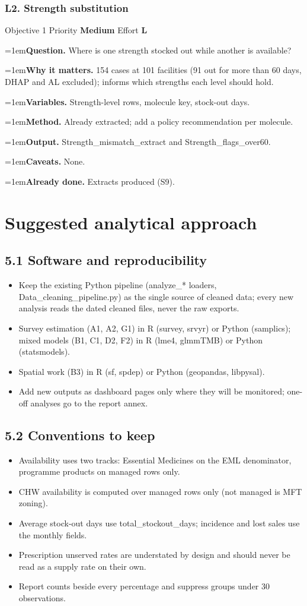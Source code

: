 \documentclass[10pt,a4paper]{article}
\newcommand{\field}[2]{\par\hangindent=1em\textbf{#1.} #2}
\begin{document}
\subsubsection*{L2. Strength substitution}
{\footnotesize\color{gray} Objective 1 \textperiodcentered{} Priority \textbf{Medium} \textperiodcentered{} Effort \textbf{L}}
\field{Question}{Where is one strength stocked out while another is available?}
\field{Why it matters}{154 cases at 101 facilities (91 out for more than 60 days, DHAP and AL excluded); informs which strengths each level should hold.}
\field{Variables}{Strength-level rows, molecule key, stock-out days.}
\field{Method}{Already extracted; add a policy recommendation per molecule.}
\field{Output}{Strength\_mismatch\_extract and Strength\_flags\_over60.}
\field{Caveats}{None.}
\field{Already done}{Extracts produced (S9).}
\section{Suggested analytical approach}
\subsection{5.1 Software and reproducibility}
\begin{itemize}\item Keep the existing Python pipeline (analyze\_* loaders, Data\_cleaning\_pipeline.py) as the single source of cleaned data; every new analysis reads the dated cleaned files, never the raw exports.
\item Survey estimation (A1, A2, G1) in R (survey, srvyr) or Python (samplics); mixed models (B1, C1, D2, F2) in R (lme4, glmmTMB) or Python (statsmodels).
\item Spatial work (B3) in R (sf, spdep) or Python (geopandas, libpysal).
\item Add new outputs as dashboard pages only where they will be monitored; one-off analyses go to the report annex.
\end{itemize}
\subsection{5.2 Conventions to keep}
\begin{itemize}\item Availability uses two tracks: Essential Medicines on the EML denominator, programme products on managed rows only.
\item CHW availability is computed over managed rows only (not managed is MFT zoning).
\item Average stock-out days use total\_stockout\_days; incidence and lost sales use the monthly fields.
\item Prescription unserved rates are understated by design and should never be read as a supply rate on their own.
\item Report counts beside every percentage and suppress groups under 30 observations.
\end{itemize}
\end{document}
